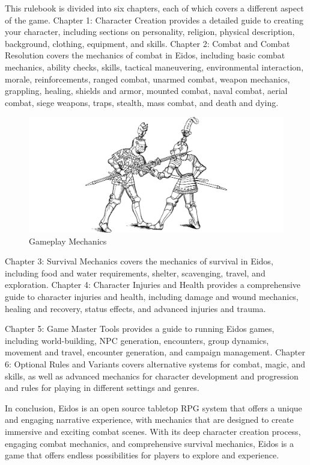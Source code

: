 \documentclass[twocolumn,12pt]{article}  %
\begin{document}
This rulebook is divided into six chapters, each of which covers a different aspect of the game. Chapter 1: Character Creation provides a detailed guide to creating your character, including sections on personality, religion, physical description, background, clothing, equipment, and skills. Chapter 2: Combat and Combat Resolution covers the mechanics of combat in Eidos, including basic combat mechanics, ability checks, skills, tactical maneuvering, environmental interaction, morale, reinforcements, ranged combat, unarmed combat, weapon mechanics, grappling, healing, shields and armor, mounted combat, naval combat, aerial combat, siege weapons, traps, stealth, mass combat, and death and dying.

\begin{figure}[h]
    \centering
    \includegraphics[width=\linewidth]{./images/index02.pdf}
    \caption{Gameplay Mechanics}
\end{figure}

Chapter 3: Survival Mechanics covers the mechanics of survival in Eidos, including food and water requirements, shelter, scavenging, travel, and exploration. Chapter 4: Character Injuries and Health provides a comprehensive guide to character injuries and health, including damage and wound mechanics, healing and recovery, status effects, and advanced injuries and trauma.

Chapter 5: Game Master Tools provides a guide to running Eidos games, including world-building, NPC generation, encounters, group dynamics, movement and travel, encounter generation, and campaign management. Chapter 6: Optional Rules and Variants covers alternative systems for combat, magic, and skills, as well as advanced mechanics for character development and progression and rules for playing in different settings and genres.

In conclusion, Eidos is an open source tabletop RPG system that offers a unique and engaging narrative experience, with mechanics that are designed to create immersive and exciting combat scenes. With its deep character creation process, engaging combat mechanics, and comprehensive survival mechanics, Eidos is a game that offers endless possibilities for players to explore and experience.
\end{document}
